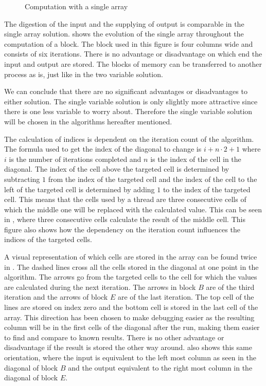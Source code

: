 \begin{figure}
    \centering
    
    \caption{Computation with a single array} \label{singlevar}
\end{figure}

The digestion of the input and the supplying of output is comparable in the single array solution.
 shows the evolution of the single array throughout the computation of a block.
The block used in this figure is four columns wide and consists of six iterations.
There is no advantage or disadvantage on which end the input and output are stored.
The blocks of memory can be transferred to another process as is, just like in the two variable solution.

We can conclude that there are no significant advantages or disadvantages to either solution.
The single variable solution is only slightly more attractive since there is one less variable to worry about.
Therefore the single variable solution will be chosen in the algorithms hereafter mentioned.

The calculation of indices is dependent on the iteration count of the algorithm.
The formula used to get the index of the diagonal to change is $i + n \cdot 2 + 1$ where $i$ is the number of iterations completed and $n$ is the index of the cell in the diagonal.
The index of the cell above the targeted cell is determined by subtracting $1$ from the index of the targeted cell and the index of the cell to the left of the targeted cell is determined by adding $1$ to the index of the targeted cell.
This means that the cells used by a thread are three consecutive cells of which the middle one will be replaced with the calculated value.
This can be seen in , where three consecutive cells calculate the result of the middle cell.
This figure also shows how the dependency on the iteration count influences the indices of the targeted cells.

A visual representation of which cells are stored in the array can be found twice in .
The dashed lines cross all the cells stored in the diagonal at one point in the algorithm.
The arrows go from the targeted cells to the cell for which the values are calculated during the next iteration.
The arrows in block $B$ are of the third iteration and the arrows of block $E$ are of the last iteration.
The top cell of the lines are stored on index zero and the bottom cell is stored in the last cell of the array.
This direction has been chosen to make debugging easier as the resulting column will be in the first cells of the diagonal after the run, making them easier to find and compare to known results.
There is no other advantage or disadvantage if the result is stored the other way around.
 also shows this same orientation, where the input is equivalent to the left most column as seen in the diagonal of block $B$ and the output equivalent to the right most column in the diagonal of block $E$.

